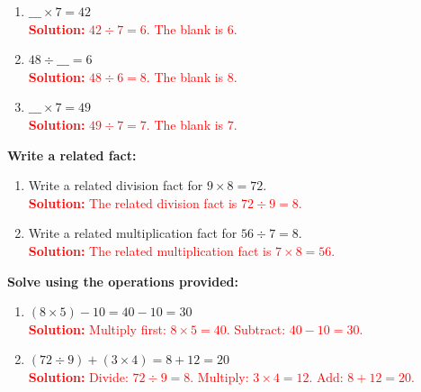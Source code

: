 \documentclass[12pt]{article}
\begin{document}
\begin{tcolorbox}[colframe=black!60, colback=white, 
coltitle=black, colbacktitle=black!15, fonttitle=\bfseries\Large, 
title=Exercises, halign title=center, left=10pt, right=10pt, top=10pt, bottom=60pt]
\begin{enumerate}[resume, itemsep=1em]
    \item \(\_\_\_ \times 7 = 42\) \\
    \textcolor{red}{\textbf{Solution:} \(42 \div 7 = 6\). The blank is \(6\).}
    
    \item \(48 \div \_\_\_ = 6\) \\
    \textcolor{red}{\textbf{Solution:} \(48 \div 6 = 8\). The blank is \(8\).}
    
    \item \(\_\_\_ \times 7 = 49\) \\
    \textcolor{red}{\textbf{Solution:} \(49 \div 7 = 7\). The blank is \(7\).}
\end{enumerate}

\textbf{Write a related fact:}
\begin{enumerate}[resume, itemsep=2em]
    \item Write a related division fact for \(9 \times 8 = 72\).\\
    \textcolor{red}{\textbf{Solution:} The related division fact is \(72 \div 9 = 8\).}
    
    \item Write a related multiplication fact for \(56 \div 7 = 8\).\\
    \textcolor{red}{\textbf{Solution:} The related multiplication fact is \(7 \times 8 = 56\).}
\end{enumerate}

\textbf{Solve using the operations provided:}
\begin{enumerate}[resume, itemsep=1em]
    \item \((8 \times 5) - 10 = 40 - 10 = 30\)\\
    \textcolor{red}{\textbf{Solution:} Multiply first: \(8 \times 5 = 40\). Subtract: \(40 - 10 = 30\).}
    
    \item \((72 \div 9) + (3 \times 4) = 8 + 12 = 20\)\\
    \textcolor{red}{\textbf{Solution:} Divide: \(72 \div 9 = 8\). Multiply: \(3 \times 4 = 12\). Add: \(8 + 12 = 20\).}
\end{enumerate}
\end{tcolorbox}

\vspace{1em}
\end{document}
